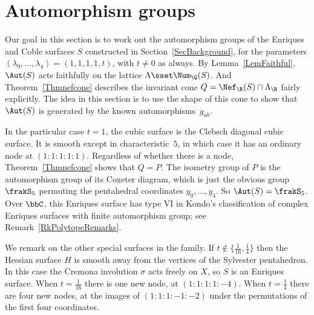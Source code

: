 \section{Automorphism groups}\label{SecAuts}

Our goal in this section is to work out the automorphism groups of the Enriques and Coble surfaces $S$ constructed in Section~\ref{SecBackground}, for the parameters $(\lambda_0,\dots,\lambda_4)=(1,1,1,1,t)$, with $t\neq0$ as always. By Lemma~\ref{LemFaithful}, $\Aut(S)$ acts faithfully on the lattice $\Lambda\sset\Num_\Q(S)$. And Theorem~\ref{Thmnefcone} describes the invariant cone $Q=\Nef_\R(S)\cap\Lambda_\R$ fairly explicitly. The idea in this section is to use the shape of this cone to show that $\Aut(S)$ is generated by the known automorphisms~$g_{ab}$.

In the particular case $t=1$, the cubic surface is the Clebsch diagonal cubic surface. It is smooth except in characteristic~$5$, in which case it has an ordinary node at $(1{:}1{:}1{:}1{:}1)$. Regardless of whether there is a node, Theorem~\ref{Thmnefcone} shows that $Q=P$. The isometry group of $P$ is the automorphism group of its Coxeter diagram, which is just the obvious group $\frakS_5$ permuting the pentahedral coordinates $y_0,\dots,y_4$. So $\Aut(S)=\frakS_5$. Over $\bbC$, this Enriques surface has type VI in Kondo's classification of complex Enriques surfaces with finite automorphism group; see Remark~\ref{RkPolytopeRemarks}.

We remark on the other special surfaces in the family. If $t\notin\{\frac1{16},\frac14\}$ then the Hessian surface $H$ is smooth away from the vertices of the Sylvester pentahedron. In this case the Cremona involution $\sigma$ acts freely on $X$, so $S$ is an Enriques surface. When $t=\frac1{16}$ there is one new node, at $(1{:}1{:}1{:}1{:}{-4})$. When $t=\frac14$ there are four new nodes, at the images of $(1{:}1{:}1{:}{-1}{:}{-2})$ under the permutations of the first four coordinates.

